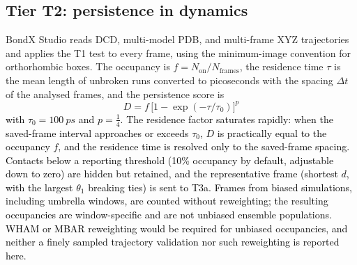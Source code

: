 \documentclass[journal=jcisd8,manuscript=article,layout=two-column]{achemso}
\newcommand{\tcb}[1]{{\textcolor{black}{#1}}}
\newcommand{\BX}{BondX Studio}
\begin{document}
\subsection{Tier T2: persistence in dynamics}
\BX{} reads DCD, multi-model PDB, and multi-frame XYZ trajectories and applies the T1 test to every frame, using the minimum-image convention for orthorhombic boxes. The occupancy is $f=N_\mathrm{on}/N_\mathrm{frames}$, the residence time $\tau$ is the mean length of unbroken runs converted to picoseconds with the spacing $\Delta t$ of the analysed frames, and the persistence score is
\begin{equation}
D=f\,\bigl[1-\exp(-\tau/\tau_0)\bigr]^{p}
\end{equation}
\tcb{with $\tau_0=\SI{100}{ps}$ and $p=\tfrac14$. The residence factor saturates rapidly: when the saved-frame interval approaches or exceeds $\tau_0$, $D$ is practically equal to the occupancy $f$, and the residence time is resolved only to the saved-frame spacing. Contacts below a reporting threshold (10\% occupancy by default, adjustable down to zero) are hidden but retained, and the representative frame (shortest $d$, with the largest $\theta_1$ breaking ties) is sent to T3a. Frames from biased simulations, including umbrella windows, are counted without reweighting; the resulting occupancies are window-specific and are not unbiased ensemble populations. WHAM or MBAR reweighting would be required for unbiased occupancies, and neither a finely sampled trajectory validation nor such reweighting is reported here.}
\end{document}
